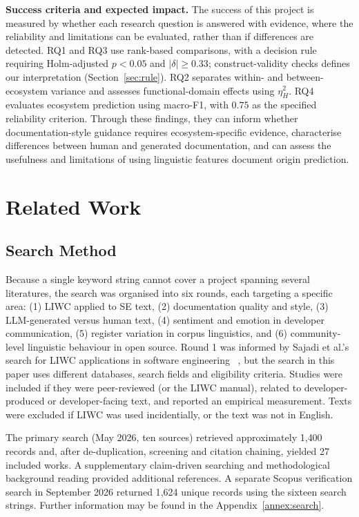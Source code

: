 \documentclass[conference]{IEEEtran}
\begin{document}
\textbf{Success criteria and expected impact.} The success of this project is measured by whether each research question is answered with evidence, where the reliability and limitations can be evaluated, rather than if differences are detected. RQ1 and RQ3 use rank-based comparisons, with a decision rule requiring Holm-adjusted $p < 0.05$ and $|\delta| \ge 0.33$; construct-validity checks defines our interpretation (Section~\ref{sec:rule}). RQ2 separates within- and between-ecosystem variance and assesses functional-domain effects using $\eta^2_H$. RQ4 evaluates ecosystem prediction using macro-F1, with $0.75$ as the specified reliability criterion. Through these findings, they can inform whether documentation-style guidance requires ecosystem-specific evidence,  characterise differences between human and generated documentation, and can assess the usefulness and limitations of using linguistic features document origin prediction.

\section{Related Work}
\label{sec:related}

\subsection{Search Method}

Because a single keyword string cannot cover a project spanning several literatures, the search was organised into six rounds, each targeting a specific area: (1) LIWC applied to SE text, (2) documentation quality and style, (3) LLM-generated versus human text, (4) sentiment and emotion in developer communication, (5) register variation in corpus linguistics, and (6) community-level linguistic behaviour in open source. Round 1 was informed by Sajadi et al.'s search for LIWC applications in software engineering ~\cite{sajadi2026}, but the search in this paper uses different databases, search fields and eligibility criteria. Studies were included if they were peer-reviewed (or the LIWC manual), related to developer-produced or developer-facing text, and reported an empirical measurement. Texts were excluded if LIWC was used incidentially, or the text was not in English.

The primary search (May 2026, ten sources) retrieved approximately 1{,}400 records and, after de-duplication, screening and citation chaining, yielded 27 included works. A supplementary claim-driven searching and methodological background reading provided additional references. A separate Scopus verification search in September 2026 returned 1{,}624 unique records using the sixteen search strings. Further information may be found in the Appendix~\ref{annex:search}.
\end{document}
